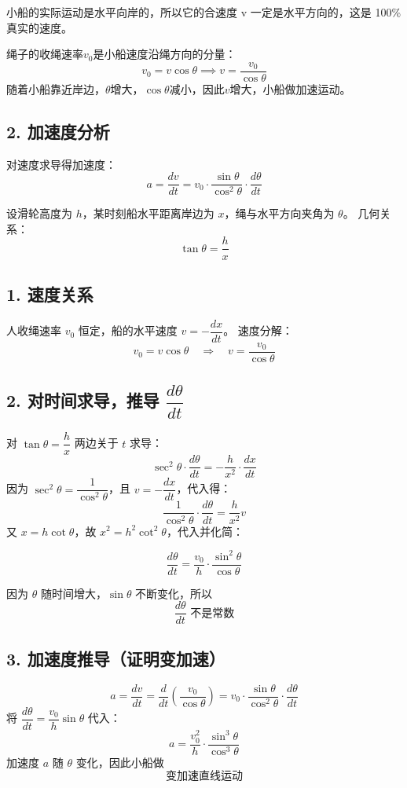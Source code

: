 \documentclass[11pt,a4paper]{article}
\begin{document}
小船的实际运动是水平向岸的，所以它的合速度 v 一定是水平方向的，这是 100\% 真实的速度。

绳子的收绳速率$v_0$是小船速度沿绳方向的分量：
\[
v_0 = v \cos\theta \implies v = \frac{v_0}{\cos\theta}
\]
随着小船靠近岸边，$\theta$增大，$\cos\theta$减小，因此$v$增大，小船做加速运动。

\subsection*{2. 加速度分析}
对速度求导得加速度：
\[
a = \frac{dv}{dt} = v_0 \cdot \frac{\sin\theta}{\cos^2\theta} \cdot \frac{d\theta}{dt}
\]



设滑轮高度为 \(h\)，某时刻船水平距离岸边为 \(x\)，绳与水平方向夹角为 \(\theta\)。
几何关系：
\[
\tan\theta = \frac{h}{x}
\]

\subsection*{1. 速度关系}
人收绳速率 \(v_0\) 恒定，船的水平速度 \(v = -\dfrac{dx}{dt}\)。
速度分解：
\[
v_0 = v\cos\theta \quad\Rightarrow\quad v = \frac{v_0}{\cos\theta}
\]

\subsection*{2. 对时间求导，推导 \(\dfrac{d\theta}{dt}\)}
对 \(\tan\theta = \dfrac{h}{x}\) 两边关于 \(t\) 求导：
\[
\sec^2\theta \cdot \frac{d\theta}{dt} = -\frac{h}{x^2}\cdot \frac{dx}{dt}
\]
因为 \(\sec^2\theta = \dfrac{1}{\cos^2\theta}\)，且 \(v = -\dfrac{dx}{dt}\)，代入得：
\[
\frac{1}{\cos^2\theta}\cdot \frac{d\theta}{dt} = \frac{h}{x^2} v
\]
又 \(x = h\cot\theta\)，故 \(x^2 = h^2\cot^2\theta\)，代入并化简：

\[
\frac{d\theta}{dt} = \frac{v_0}{h} \cdot \frac{\sin^2\theta}{\cos\theta}
\]

因为 \(\theta\) 随时间增大，\(\sin\theta\) 不断变化，所以
\[
\boxed{\frac{d\theta}{dt} \text{ 不是常数}}
\]

\subsection*{3. 加速度推导（证明变加速）}
\[
a = \frac{dv}{dt} = \frac{d}{dt}\left(\frac{v_0}{\cos\theta}\right)
     = v_0 \cdot \frac{\sin\theta}{\cos^2\theta}\cdot \frac{d\theta}{dt}
\]
将 \(\dfrac{d\theta}{dt} = \dfrac{v_0}{h}\sin\theta\) 代入：
\[
a = \frac{v_0^2}{h}\cdot \frac{\sin^3\theta}{\cos^3\theta}
\]
加速度 \(a\) 随 \(\theta\) 变化，因此小船做
\[
\boxed{\text{变加速直线运动}}
\]
\end{document}
